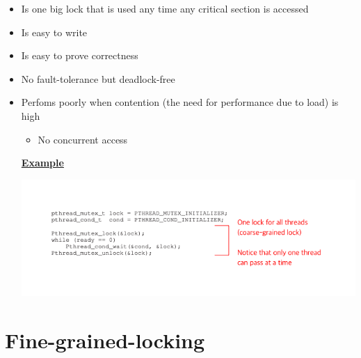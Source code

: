 \documentclass[12pt]{article}
\begin{document}
\begin{itemize}
    \item Is one big lock that is used any time any critical section is accessed
    \item Is easy to write
    \item Is easy to prove correctness
    \item No fault-tolerance but deadlock-free
    \item Perfoms poorly when contention (the need for performance due to load) is high
    \begin{itemize}
        \item No concurrent access
    \end{itemize}

    \bigskip

    \underline{\textbf{Example}}

    \bigskip

    \begin{center}
    \includegraphics[width=\linewidth]{../images/midterm_3_solution_10.png}
    \end{center}
\end{itemize}


\section{Fine-grained-locking}
\end{document}
